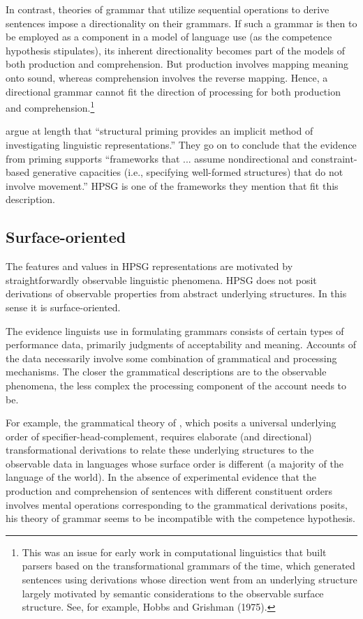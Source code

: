 \documentclass[a4paper]{article}
\begin{document}
In contrast, theories of grammar that utilize sequential operations to derive sentences impose a directionality on their grammars.  If such a grammar is then to be employed as a component in a model of language use (as the competence hypothesis stipulates), its inherent directionality becomes part of the models of both production and comprehension.  But production involves mapping meaning onto sound, whereas comprehension involves the reverse mapping.  Hence, a directional grammar cannot fit the direction of processing for both production and comprehension.\footnote{This was an issue for early work in computational linguistics that built parsers based on the transformational grammars of the time, which generated sentences using derivations whose direction went from an underlying structure largely motivated by semantic considerations to the observable surface structure.  See, for example, Hobbs and Grishman (1975).}  

\citet{BraniganPickering2017} argue at length that ``structural priming provides an implicit method of investigating linguistic representations.''  They go on to conclude that the evidence from priming supports ``frameworks that ... assume nondirectional and constraint-based generative
capacities (i.e., specifying well-formed structures) that
do not involve movement.''  HPSG is one of the frameworks they mention that fit this description.

\subsection{Surface-oriented}

The features and values in HPSG representations are motivated by straightforwardly observable
linguistic phenomena. HPSG does not posit derivations of observable properties from abstract
underlying structures.  In this sense it is surface-oriented.

The evidence linguists use in formulating grammars consists of certain types of performance data,
primarily judgments of acceptability and meaning.  Accounts of the data necessarily involve some
combination of grammatical and processing mechanisms.  The closer the grammatical descriptions are
to the observable phenomena, the less complex the processing component of the account needs to be.

For example, the grammatical theory of \citet{Kayne94a-u}, which posits a universal underlying order of
specifier-head-complement, requires elaborate (and directional) transformational derivations to
relate these underlying structures to the observable data in languages whose surface order is
different (a majority of the language of the world).  In the absence of experimental evidence that
the production and comprehension of sentences with different constituent orders involves mental
operations corresponding to the grammatical derivations \citeauthor{Kayne94a-u} posits, his theory of grammar seems to
be incompatible with the competence hypothesis.
\end{document}

